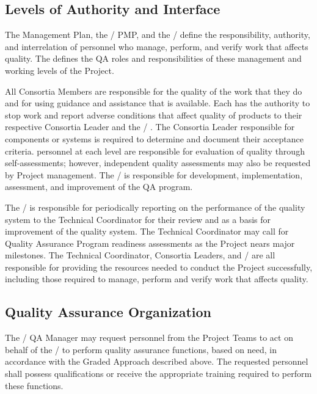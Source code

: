 \subsection{Levels of Authority and Interface}

The  Management Plan, the / PMP, and the / 
define the responsibility, authority, and
interrelation of personnel who manage, perform, and verify work that
affects quality. The  defines the QA roles and responsibilities of
these management and working levels of the  Project.

All Consortia Members are responsible for the quality of the work that
they do and for using guidance and assistance that is available. Each
has the authority to stop work and report adverse conditions that
affect quality of  products to their respective  Consortia
Leader and the / . The Consortia Leader responsible
for  components or systems is required to determine and document
their acceptance criteria.  personnel at each level are
responsible for evaluation of quality through self-assessments;
however, independent quality assessments may also be requested by
Project management.  The /  is responsible for
development, implementation, assessment, and improvement of the QA
program.

The /  is responsible for periodically reporting on
the performance of the quality system to the  Technical
Coordinator for their review and as a basis for improvement of the
quality system. The  Technical Coordinator may call for Quality
Assurance Program readiness assessments as the Project nears major
milestones. The  Technical Coordinator, Consortia Leaders, and
/  are all responsible for providing the resources
needed to conduct the Project successfully, including those required
to manage, perform and verify work that affects quality.

\subsection{Quality Assurance Organization}

The / QA Manager may request personnel from the  Project
Teams to act on behalf of the /  to perform quality
assurance functions, based on need, in accordance with the Graded
Approach described above. The requested personnel shall possess
qualifications or receive the appropriate training required to perform
these functions.

